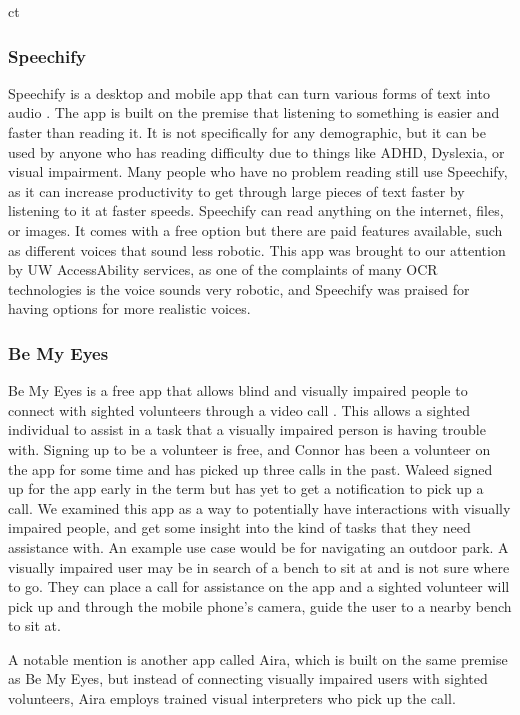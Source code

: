 ct\documentclass[a4paper,11pt]{article}
\begin{document}
\subsubsection{Speechify}
Speechify is a desktop and mobile app that can turn various forms of text into audio \cite{speechify}. The app is built on the premise that listening to something is easier and faster than reading it. It is not specifically for any demographic, but it can be used by anyone who has reading difficulty due to things like ADHD, Dyslexia, or visual impairment. Many people who have no problem reading still use Speechify, as it can increase productivity to get through large pieces of text faster by listening to it at faster speeds. Speechify can read anything on the internet, files, or images. It comes with a free option but there are paid features available, such as different voices that sound less robotic. This app was brought to our attention by UW AccessAbility services, as one of the complaints of many OCR technologies is the voice sounds very robotic, and Speechify was praised for having options for more realistic voices.

\subsubsection{Be My Eyes}
Be My Eyes is a free app that allows blind and visually impaired people to connect with sighted volunteers through a video call \cite{be-my-eyes}. This allows a sighted individual to assist in a task that a visually impaired person is having trouble with. Signing up to be a volunteer is free, and Connor has been a volunteer on the app for some time and has picked up three calls in the past. Waleed signed up for the app early in the term but has yet to get a notification to pick up a call. We examined this app as a way to potentially have interactions with visually impaired people, and get some insight into the kind of tasks that they need assistance with. An example use case would be for navigating an outdoor park. A visually impaired user may be in search of a bench to sit at and is not sure where to go. They can place a call for assistance on the app and a sighted volunteer will pick up and through the mobile phone's camera, guide the user to a nearby bench to sit at.

A notable mention is another app called Aira, which is built on the same premise as Be My Eyes, but instead of connecting visually impaired users with sighted volunteers, Aira employs trained visual interpreters who pick up the call.
\end{document}
